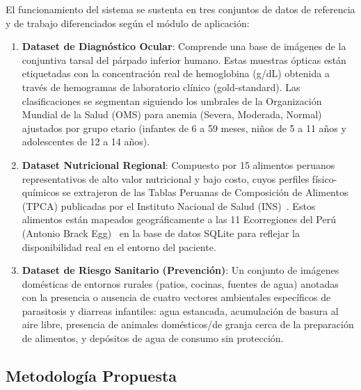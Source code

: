 El funcionamiento del sistema se sustenta en tres conjuntos de datos de referencia y de trabajo diferenciados según el módulo de aplicación:
\begin{enumerate}
    \item \textbf{Dataset de Diagnóstico Ocular}: Comprende una base de imágenes de la conjuntiva tarsal del párpado inferior humano. Estas muestras ópticas están etiquetadas con la concentración real de hemoglobina (g/dL) obtenida a través de hemogramas de laboratorio clínico (gold-standard). Las clasificaciones se segmentan siguiendo los umbrales de la Organización Mundial de la Salud (OMS) para anemia (Severa, Moderada, Normal) ajustados por grupo etario (infantes de 6 a 59 meses, niños de 5 a 11 años y adolescentes de 12 a 14 años).
    \item \textbf{Dataset Nutricional Regional}: Compuesto por 15 alimentos peruanos representativos de alto valor nutricional y bajo costo, cuyos perfiles físico-químicos se extrajeron de las Tablas Peruanas de Composición de Alimentos (TPCA) publicadas por el Instituto Nacional de Salud (INS)~\cite{INS2023}. Estos alimentos están mapeados geográficamente a las 11 Ecorregiones del Perú (Antonio Brack Egg)~\cite{brack1986ecorregiones} en la base de datos SQLite para reflejar la disponibilidad real en el entorno del paciente.
    \item \textbf{Dataset de Riesgo Sanitario (Prevención)}: Un conjunto de imágenes domésticas de entornos rurales (patios, cocinas, fuentes de agua) anotadas con la presencia o ausencia de cuatro vectores ambientales específicos de parasitosis y diarreas infantiles: agua estancada, acumulación de basura al aire libre, presencia de animales domésticos/de granja cerca de la preparación de alimentos, y depósitos de agua de consumo sin protección.
\end{enumerate}

\subsection{Metodología Propuesta}
\label{sec:metodologia}

